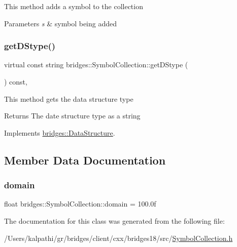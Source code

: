 This method adds a symbol to the collection


\begin{DoxyParams}{Parameters}
{\em s} & symbol being added \\
\hline
\end{DoxyParams}
\mbox{\label{classbridges_1_1_symbol_collection_a9bc5abacaf6f90b2d013963311c8052e}} 
\subsubsection{\texorpdfstring{get\+D\+Stype()}{getDStype()}}
{\footnotesize\ttfamily virtual const string bridges\+::\+Symbol\+Collection\+::get\+D\+Stype (\begin{DoxyParamCaption}{ }\end{DoxyParamCaption}) const\hspace{0.3cm}{\ttfamily [inline]}, {\ttfamily [virtual]}}

This method gets the data structure type

\begin{DoxyReturn}{Returns}
The date structure type as a string 
\end{DoxyReturn}


Implements \mbox{\hyperlink{classbridges_1_1_data_structure_a957a63b106e340bc753620c650632bdc}{bridges\+::\+Data\+Structure}}.



\subsection{Member Data Documentation}
\mbox{\label{classbridges_1_1_symbol_collection_a9387df86c54863524ab4779ff8458c7a}} 
\subsubsection{\texorpdfstring{domain}{domain}}
{\footnotesize\ttfamily float bridges\+::\+Symbol\+Collection\+::domain = 100.\+0f\hspace{0.3cm}{\ttfamily [protected]}}



The documentation for this class was generated from the following file\+:\begin{DoxyCompactItemize}
\item 
/\+Users/kalpathi/gr/bridges/client/cxx/bridges18/src/\mbox{\hyperlink{_symbol_collection_8h}{Symbol\+Collection.\+h}}\end{DoxyCompactItemize}

